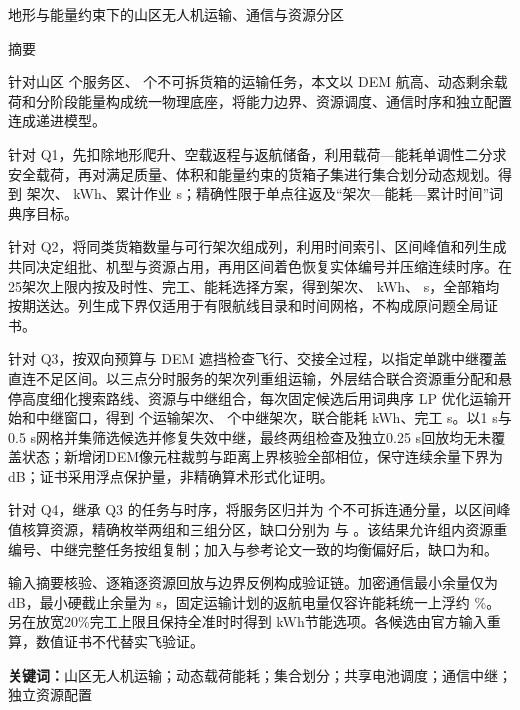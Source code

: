 \begin{center}
{\heiti{}地形与能量约束下的山区无人机运输、通信与资源分区}\par
\vspace{12pt}
{\heiti{}摘要}\par
\end{center}
针对山区 \NumServices{} 个服务区、\NumBoxes{} 个不可拆货箱的运输任务，本文以 DEM 航高、动态剩余载荷和分阶段能量构成统一物理底座，将能力边界、资源调度、通信时序和独立配置连成递进模型。

针对 Q1，先扣除地形爬升、空载返程与返航储备，利用载荷—能耗单调性二分求安全载荷，再对满足质量、体积和能量约束的货箱子集进行集合划分动态规划。得到 \QOneTrips{} 架次、\QOneEnergy{} kWh、累计作业 \QOneTime{} s；精确性限于单点往返及“架次—能耗—累计时间”词典序目标。

针对 Q2，将同类货箱数量与可行架次组成列，利用时间索引、区间峰值和列生成共同决定组批、机型与资源占用，再用区间着色恢复实体编号并压缩连续时序。在25架次上限内按及时性、完工、能耗选择方案，得到\QTwoTrips{}架次、\QTwoEnergy{} kWh、\QTwoTime{} s，全部\NumBoxes{}箱均按期送达。列生成下界仅适用于有限航线目录和时间网格，不构成原问题全局证书。

针对 Q3，按双向预算与 DEM 遮挡检查飞行、交接全过程，以指定单跳中继覆盖直连不足区间。以三点分时服务的架次列重组运输，外层结合联合资源重分配和悬停高度细化搜索路线、资源与中继组合，每次固定候选后用词典序 LP 优化运输开始和中继窗口，得到 \QThreeTrips{} 个运输架次、\RelayTrips{} 个中继架次，联合能耗 \JointEnergy{} kWh、完工 \JointTime{} s。以1 s与0.5 s网格并集筛选候选并修复失效中继，最终两组检查及独立0.25 s回放均无未覆盖状态；新增闭DEM像元柱裁剪与距离上界核验全部相位，保守连续余量下界为\ContinuousMargin{} dB；证书采用浮点保护量，非精确算术形式化证明。

针对 Q4，继承 Q3 的任务与时序，将服务区归并为 \AtomicGroups{} 个不可拆连通分量，以区间峰值核算资源，精确枚举两组和三组分区，缺口分别为 \GapTwo{} 与 \GapThree{}。该结果允许组内资源重编号、中继完整任务按组复制；加入与参考论文一致的均衡偏好后，缺口为\BalancedGapTwo{}和\BalancedGapThree{}。

输入摘要核验、逐箱逐资源回放与边界反例构成验证链。加密通信最小余量仅为 \MarginHalf{} dB，最小硬截止余量为\HardSlack{} s，固定运输计划的返航电量仅容许能耗统一上浮约 \QThreeEnergyTolerance\%。另在放宽20\%完工上限且保持全准时时得到\EnergyChoiceEnergy{} kWh节能选项。各候选由官方输入重算，数值证书不代替实飞验证。

\vspace{8pt}
\noindent\textbf{关键词：}山区无人机运输；动态载荷能耗；集合划分；共享电池调度；通信中继；独立资源配置
